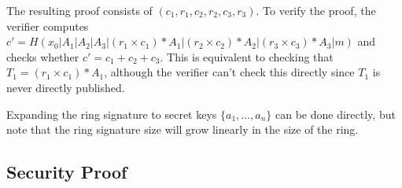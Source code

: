 \documentclass[11pt]{article}
\begin{document}
The resulting proof consists of $(c_1, r_1, c_2, r_2, c_3, r_3)$. To verify the proof, the verifier computes $c' = H(x_0 | A_1 | A_2 | A_3 | (r_1 \times c_1) * A_1 | (r_2 \times c_2) * A_2 | (r_3 \times c_3) * A_3 | m)$ and checks whether $c' = c_1 + c_2 + c_3$. This is equivalent to checking that $T_1 = (r_1 \times c_1) * A_1$, although the verifier can't check this directly since $T_1$ is never directly published.

Expanding the ring signature to secret keys $\{a_1, \dots, a_n\}$ can be done directly, but note that the ring signature size will grow linearly in the size of the ring.

\subsection*{Security Proof}



{}

\end{document}
